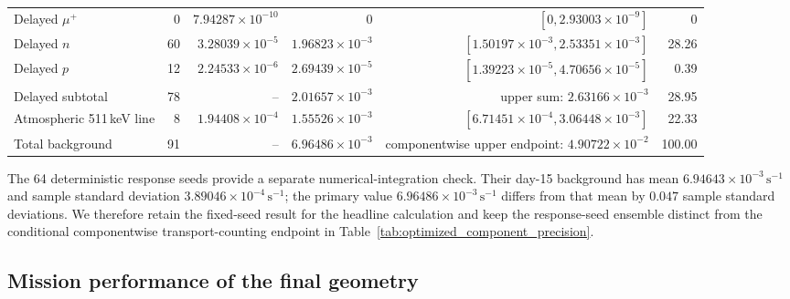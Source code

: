 \documentclass[11pt]{article}
\newcommand{\cps}{\ensuremath{\,\mathrm{s^{-1}}}}
\begin{document}
\begin{table}[!ht]
{\begin{tabular}{lrrrrr}
Delayed $\mu^+$ & 0 & $7.94287\times10^{-10}$ & 0 & $[0,2.93003\times10^{-9}]$ & 0 \\
Delayed $n$ & 60 & $3.28039\times10^{-5}$ & $1.96823\times10^{-3}$ & $[1.50197\times10^{-3},2.53351\times10^{-3}]$ & 28.26 \\
Delayed $p$ & 12 & $2.24533\times10^{-6}$ & $2.69439\times10^{-5}$ & $[1.39223\times10^{-5},4.70656\times10^{-5}]$ & 0.39 \\
Delayed subtotal & 78 & -- & $2.01657\times10^{-3}$ & upper sum: $2.63166\times10^{-3}$ & 28.95 \\
Atmospheric 511\,keV line & 8 & $1.94408\times10^{-4}$ & $1.55526\times10^{-3}$ & $[6.71451\times10^{-4},3.06448\times10^{-3}]$ & 22.33 \\
\midrule
Total background & 91 & -- & $6.96486\times10^{-3}$ & componentwise upper endpoint: $4.90722\times10^{-2}$ & 100.00 \\
\bottomrule
\end{tabular}}
\end{table}

The 64 deterministic response seeds provide a separate numerical-integration
check. Their day-15 background has mean
$6.94643\times10^{-3}\cps$ and sample standard deviation
$3.89046\times10^{-4}\cps$; the  primary value
$6.96486\times10^{-3}\cps$ differs from that mean by $0.047$ sample standard
deviations. We therefore retain the fixed-seed result for the headline calculation
and keep the response-seed ensemble distinct from the conditional componentwise
transport-counting endpoint in Table~\ref{tab:optimized_component_precision}.

\FloatBarrier

\subsection{Mission performance of the final geometry}
\label{subsec:final_mission_performance}
\end{document}

